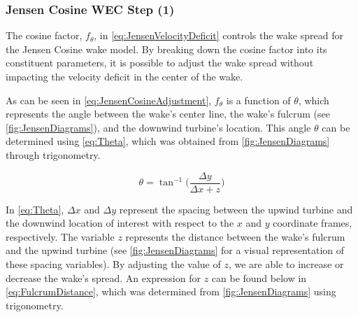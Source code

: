 \documentclass[a4paper]{jpconf}
\begin{document}

\subsubsection{Jensen Cosine WEC Step (1)} 

The cosine factor, $f_\theta$, in \cref{eq:JensenVelocityDeficit} controls the wake spread for the Jensen Cosine wake model. By breaking down the cosine factor into its constituent parameters, it is possible to adjust the wake spread without impacting the velocity deficit in the center of the wake.


As can be seen in \cref{eq:JensenCosineAdjustment}, $f_\theta$ is a function of $\theta$, which represents the angle between the wake's center line, the wake's fulcrum (see \cref{fig:JensenDiagrams}), and the downwind turbine's location. This angle $\theta$ can be determined using \cref{eq:Theta}, which was obtained from \cref{fig:JensenDiagrams} through trigonometry.

\begin{equation}
\theta = \tan^{-1}\Big( \frac{\Delta y}{\Delta x + z} \Big)
\label{eq:Theta}
\end{equation}

In \cref{eq:Theta}, $\Delta x$ and $\Delta y$ represent the spacing between the upwind turbine and the downwind location of interest with respect to the $x$ and $y$ coordinate frames, respectively. The variable $z$ represents the distance between the wake's fulcrum and the upwind turbine (see \cref{fig:JensenDiagrams} for a visual representation of these spacing variables). By adjusting the value of $z$, we are able to increase or decrease the wake's spread. An expression for $z$ can be found below in \cref{eq:FulcrumDistance}, which was determined from \cref{fig:JensenDiagrams} using trigonometry.
\end{document}

